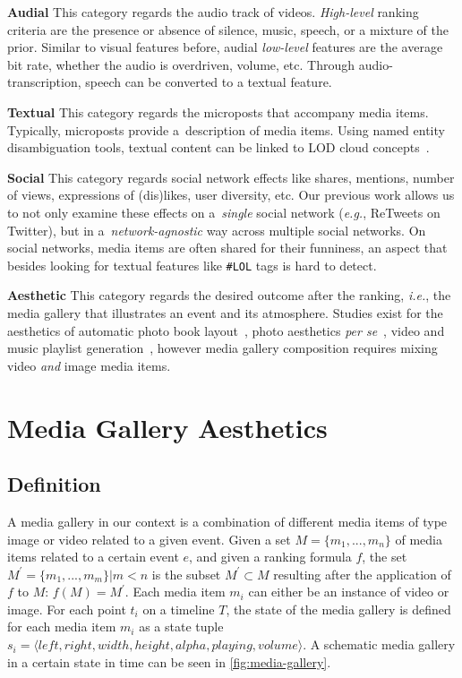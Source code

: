 \documentclass{article}
\begin{document}
\noindent \textbf{Audial}
This category regards the audio track of videos.
\emph{High-level} ranking criteria are the presence or absence
of silence, music, speech, or a mixture of the prior.
Similar to visual features before,
audial \emph{low-level}  features are the average bit rate,
whether the audio is overdriven, volume, etc.
Through audio-transcription, speech can be converted to a textual feature.

\noindent \textbf{Textual}
This category regards the microposts that accompany media items.
Typically, microposts provide a~description of media items.
Using named entity disambiguation tools,
textual content can be linked to LOD cloud concepts~\cite{Facebook2011}.

\noindent \textbf{Social}
This category regards social network effects like shares, mentions,
number of views, expressions of (dis)likes, user diversity, etc.
Our previous work allows us to not only examine these effects
on a~\emph{single} social network (\emph{e.g.}, ReTweets on Twitter),
but in a~\emph{network-agnostic} way across multiple social networks.
On social networks, media items are often shared for their funniness,
an aspect that besides looking for textual features
like \texttt{\#LOL} tags is hard to detect.

\noindent \textbf{Aesthetic}
This category regards the desired outcome after the ranking, \emph{i.e.},
the media gallery that illustrates an event and its atmosphere.
Studies exist for the aesthetics of
automatic photo book layout~\cite{Photo2011},
photo aesthetics \emph{per se}~\cite{Photo2012},
video and music playlist generation~\cite{YouTube2010,Playlist2006},
however media gallery composition requires mixing video
\emph{and} image media items.

\section{Media Gallery Aesthetics}

\subsection{Definition}
A media gallery in our context is a combination of different media items
of type image or video related to a given event.
Given a set $M = \{m_1,..., m_n\}$ of media items related to a certain event $e$,
and given a ranking formula $f$,
the set $M^\prime = \{m_1,..., m_m\} | m<n$ is the subset $M^\prime \subset M$
resulting after the application of $f$ to $M$: $f(M)=M^\prime$.
Each media item $m_i$ can either be an instance of video or image.
For each point $t_i$ on a timeline $T$, the state of the media gallery is defined
for each media item $m_i$ as a state tuple
$s_i=\langle left, right, width, height, alpha, playing, volume \rangle$.
A schematic media gallery in a certain state in time
can be seen in \autoref{fig:media-gallery}.
\end{document}
